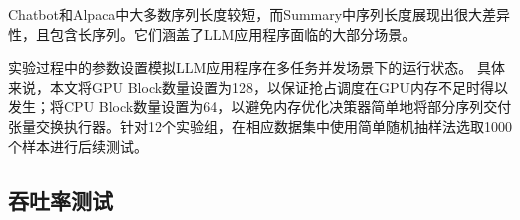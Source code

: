 Chatbot和Alpaca中大多数序列长度较短，而Summary中序列长度展现出很大差异性，且包含长序列。它们涵盖了LLM应用程序面临的大部分场景。

实验过程中的参数设置模拟LLM应用程序在多任务并发场景下的运行状态。{\color{red} 具体来说，本文将GPU Block数量设置为128，以保证抢占调度在GPU内存不足时得以发生；将CPU Block数量设置为64，以避免内存优化决策器简单地将部分序列交付张量交换执行器。}针对12个实验组，在相应数据集中使用简单随机抽样法选取1000个样本进行后续测试。







\subsection{吞吐率测试}

